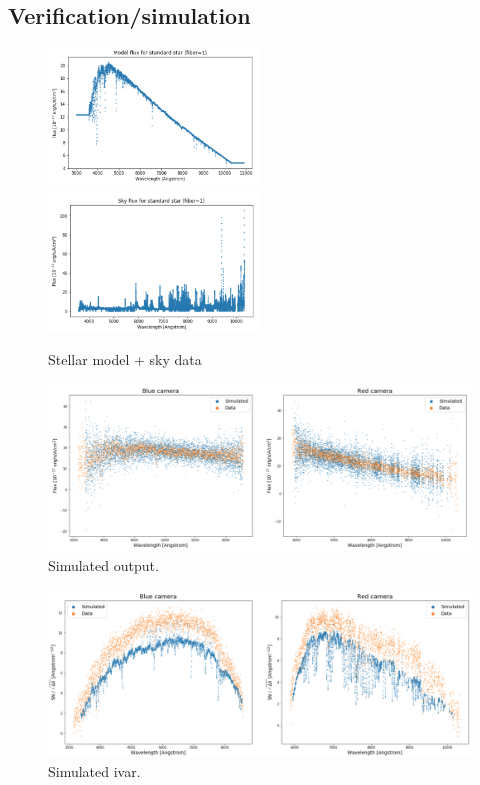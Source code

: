 \subsection{Verification/simulation}

\begin{figure}[h]
    \centering
    \includegraphics[width=0.495\textwidth]{images/specsim/stellar_model_4055_55359_1.png}
    \includegraphics[width=0.495\textwidth]{images/specsim/sky_flux_4055_55359_1.png}
    \caption{Stellar model + sky data}
    \label{fig:star_sky}
\end{figure}


\begin{figure}[h]
\centering
\includegraphics[width=17cm]{images/specsim/simulated_output_4055_55359_1.png}
\caption{Simulated output.}
\label{fig:simulated_flux}
\end{figure}

\begin{figure}[h]
\centering
\includegraphics[width=16cm]{images/specsim/ivar_4055_55359_1.png}
\caption{Simulated ivar.}
\label{fig:simulated_ivar}
\end{figure}

